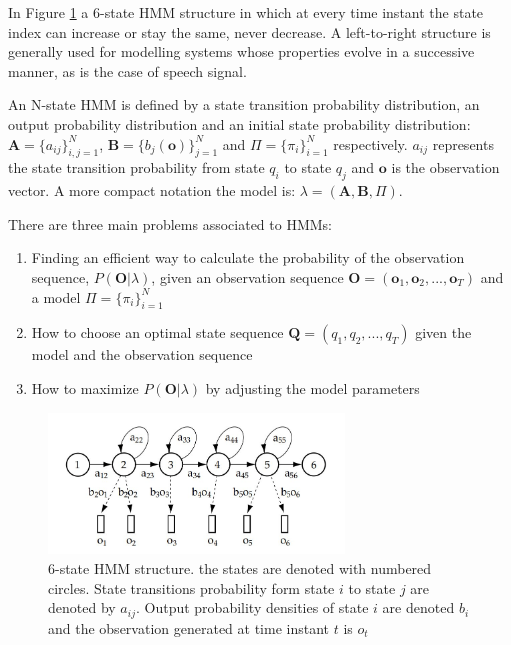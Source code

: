 In Figure \ref{fig:hmm_structure} a 6-state HMM structure in which at every time instant the state index can increase or stay the same, never decrease. 
%
A left-to-right structure is generally used for modelling systems whose properties evolve in a successive manner, as is the case of speech signal.

An N-state HMM is defined by a state transition probability distribution, an output probability distribution and an initial state probability distribution: $\mathbf{A} = \lbrace a_{ij}\rbrace _{i,j=1}^{N}$, $\mathbf{B} = \lbrace b_{j}(\mathbf{o})\rbrace _{j=1}^{N}$ and $\Pi = \lbrace \pi _{i} \rbrace _{i=1}^{N}$ respectively.
% 
$a_{ij}$ represents the state transition probability from state $q_{i}$ to state $q_{j}$ and $\mathbf{o}$ is the observation vector. A more compact notation the model is: $\lambda = (\mathbf{A},\mathbf{B},\Pi)$.

There are three main problems associated to HMMs:
\begin{enumerate}
	\item Finding an efficient way to calculate the probability of the observation sequence, $P(\mathbf{O}|\lambda)$, given an observation sequence $\mathbf{O} = (\mathbf{o}_{1},\mathbf{o}_{2},...,\mathbf{o}_{T})$ and a model $\Pi = \lbrace \pi _{i} \rbrace _{i=1}^{N}$
	\item How to choose an optimal state sequence $\mathbf{Q} = (q_{1},q_{2},...,q_{T})$ given the model and the observation sequence
	\item How to maximize $P(\mathbf{O}|\lambda)$ by adjusting the model parameters
\end{enumerate}

\begin{figure}[!htb]
\begin{centering}
\includegraphics[width=0.7\textwidth]{images/hmm_structure.jpg}
\caption{6-state HMM structure. the states are denoted with numbered circles. State transitions probability form state $i$ to state $j$ are denoted by $a_{ij}$. Output probability densities of state $i$ are denoted $b_{i}$ and the observation generated at time instant $t$ is $o_{t}$}
\label{fig:hmm_structure}
\end{centering}
\end{figure}


